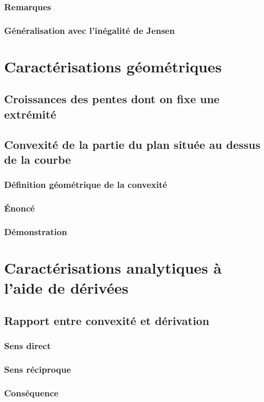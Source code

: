 \documentclass[12pt,a4paper,french]{book}
\begin{document}
			\subsubsection{Remarques}
			\subsubsection{Généralisation avec l'inégalité de Jensen}
	\section{Caractérisations géométriques}
		\subsection{Croissances des pentes dont on fixe une extrémité}
		\subsection{Convexité de la partie du plan située au dessus de la courbe}
			\subsubsection{Définition géométrique de la convexité}
			\subsubsection{Énoncé}
			\subsubsection{Démonstration}
	\section{Caractérisations analytiques à l'aide de dérivées}
		\subsection{Rapport entre convexité et dérivation}
			\subsubsection{Sens direct}
			\subsubsection{Sens réciproque}
			\subsubsection{Conséquence}
\end{document}
